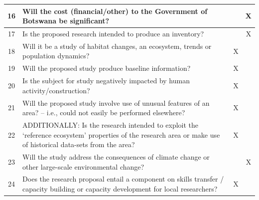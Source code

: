 \documentclass[12pt,a4paper]{article}
\begin{document}
{\begin{center}
\begin{tabular}{|c|p{11.6cm}|c|c|}
16 & Will the cost (financial/other) to the Government of Botswana be significant? & & X \\ \hline
17 & Is the proposed research intended to produce an inventory? & & X \\ \hline
18 & Will it be a study of habitat changes, an ecosystem, trends or population dynamics? & X & \\ \hline
19 & Will the proposed study produce baseline information? & X & \\ \hline
20 & Is the subject for study negatively impacted by human activity/construction? & X & \\ \hline
21 & Will the proposed study involve use of unusual features of an area? -- i.e., could not easily be performed elsewhere? & X & \\ \hline
22 & ADDITIONALLY: Is the research intended to exploit the `reference ecosystem' properties of the research area or make use of historical data-sets from the area? & X & \\ \hline
23 & Will the study address the consequences of climate change or other large-scale environmental change? & & X \\ \hline
24 & Does the research proposal entail a component on skills transfer / capacity building or capacity development for local researchers? & X & \\ \hline
\end{tabular}
\end{center}
}
\end{document}
